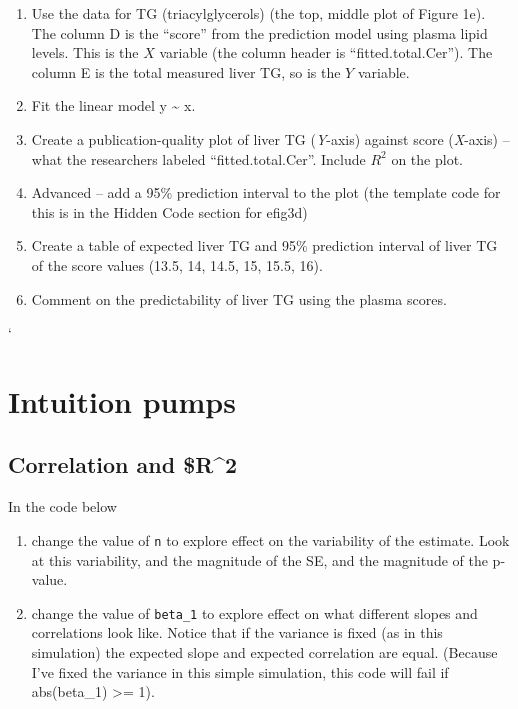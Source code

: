 \documentclass[]{book}
\providecommand{\tightlist}{%
  \setlength{\itemsep}{0pt}\setlength{\parskip}{0pt}}
\begin{document}
\begin{enumerate}
\def\labelenumi{\arabic{enumi}.}
\tightlist
\item
  Use the data for TG (triacylglycerols) (the top, middle plot of Figure 1e). The column D is the ``score'' from the prediction model using plasma lipid levels. This is the \(X\) variable (the column header is ``fitted.total.Cer''). The column E is the total measured liver TG, so is the \(Y\) variable.
\item
  Fit the linear model y \textasciitilde{} x.
\item
  Create a publication-quality plot of liver TG (\emph{Y}-axis) against score (\emph{X}-axis) -- what the researchers labeled ``fitted.total.Cer''. Include \(R^2\) on the plot.
\item
  Advanced -- add a 95\% prediction interval to the plot (the template code for this is in the Hidden Code section for efig3d)
\item
  Create a table of expected liver TG and 95\% prediction interval of liver TG of the score values (13.5, 14, 14.5, 15, 15.5, 16).
\item
  Comment on the predictability of liver TG using the plasma scores.
\end{enumerate}

`

\hypertarget{intuition-pumps}{%
\section{Intuition pumps}\label{intuition-pumps}}

\hypertarget{correlation-and-r2}{%
\subsection{Correlation and \$R\^{}2}\label{correlation-and-r2}}

In the code below

\begin{enumerate}
\def\labelenumi{\arabic{enumi}.}
\tightlist
\item
  change the value of \texttt{n} to explore effect on the variability of the estimate. Look at this variability, and the magnitude of the SE, and the magnitude of the p-value.
\item
  change the value of \texttt{beta\_1} to explore effect on what different slopes and correlations look like. Notice that if the variance is fixed (as in this simulation) the expected slope and expected correlation are equal. (Because I've fixed the variance in this simple simulation, this code will fail if abs(beta\_1) \textgreater= 1).
\end{enumerate}
\end{document}
